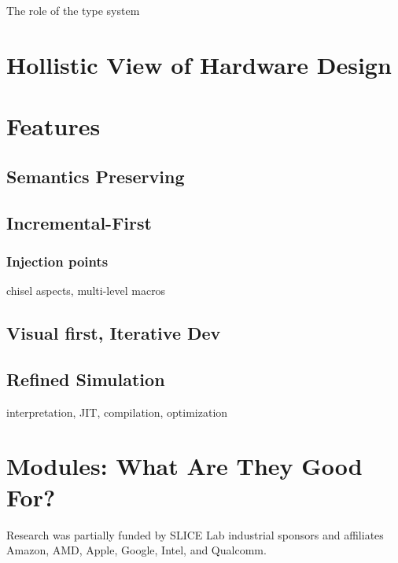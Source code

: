 \documentclass[sigplan,review,nonacm,9pt]{acmart}
\begin{document}
The role of the type system

\section{Hollistic View of Hardware Design}



\section{Features}
\subsection{Semantics Preserving}

\subsection{Incremental-First}

\subsubsection{Injection points}
chisel aspects, multi-level macros

\subsection{Visual first, Iterative Dev}

\subsection{Refined Simulation}

interpretation, JIT, compilation, optimization


\section{Modules: What Are They Good For?}

\begin{acks}
Research was partially funded by SLICE Lab industrial sponsors and affiliates Amazon, AMD, Apple, Google, Intel, and Qualcomm.
\end{acks}




\end{document}

